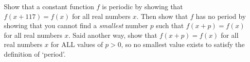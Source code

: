 {Show that a constant function $f$ is periodic by showing that $f(x + 117) = f(x)$ for all real numbers $x$. Then show that $f$ has no period by showing that you cannot find a \emph{smallest} number $p$ such that $f(x + p) = f(x)$ for all real numbers $x$.  Said another way, show that $f(x + p) = f(x)$ for all real numbers $x$ for ALL values of $p > 0$, so no smallest value exists to satisfy the definition of `period'.}
{}
